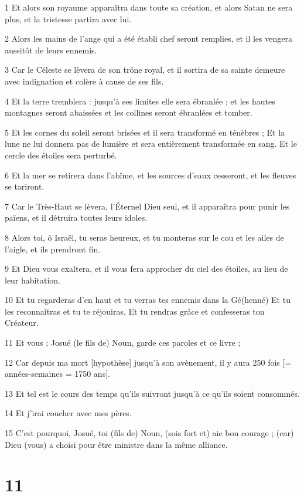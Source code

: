 \par 1 Et alors son royaume apparaîtra dans toute sa création, et alors Satan ne sera plus, et la tristesse partira avec lui.
\par 2 Alors les mains de l'ange qui a été établi chef seront remplies, et il les vengera aussitôt de leurs ennemis.
\par 3 Car le Céleste se lèvera de son trône royal, et il sortira de sa sainte demeure avec indignation et colère à cause de ses fils.
\par 4 Et la terre tremblera : jusqu'à ses limites elle sera ébranlée ; et les hautes montagnes seront abaissées et les collines seront ébranlées et tomber.
\par 5 Et les cornes du soleil seront brisées et il sera transformé en ténèbres ; Et la lune ne lui donnera pas de lumière et sera entièrement transformée en sang. Et le cercle des étoiles sera perturbé.
\par 6 Et la mer se retirera dans l'abîme, et les sources d'eaux cesseront, et les fleuves se tariront.
\par 7 Car le Très-Haut se lèvera, l'Éternel Dieu seul, et il apparaîtra pour punir les païens, et il détruira toutes leurs idoles.
\par 8 Alors toi, ô Israël, tu seras heureux, et tu monteras sur le cou et les ailes de l'aigle, et ils prendront fin.
\par 9 Et Dieu vous exaltera, et il vous fera approcher du ciel des étoiles, au lieu de leur habitation.
\par 10 Et tu regarderas d'en haut et tu verras tes ennemis dans la Gé(henné) Et tu les reconnaîtras et tu te réjouiras, Et tu rendras grâce et confesseras ton Créateur.
\par 11 Et vous ; Josué (le fils de) Noun, garde ces paroles et ce livre ;
\par 12 Car depuis ma mort [hypothèse] jusqu'à son avènement, il y aura 250 fois [= années-semaines = 1750 ans].
\par 13 Et tel est le cours des temps qu'ils suivront jusqu'à ce qu'ils soient consommés.
\par 14 Et j'irai coucher avec mes pères.
\par 15 C'est pourquoi, Josué, toi (fils de) Noun, (sois fort et) aie bon courage ; (car) Dieu (vous) a choisi pour être ministre dans la même alliance.

\chapter{11}


